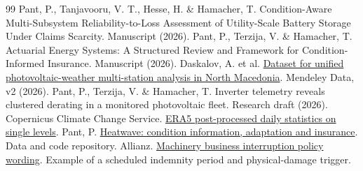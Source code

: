\documentclass[11pt,a4paper]{article}
\begin{document}
\begin{thebibliography}{99}
 Pant, P., Tanjavooru, V. T., Hesse, H. \& Hamacher, T. Condition-Aware Multi-Subsystem Reliability-to-Loss Assessment of Utility-Scale Battery Storage Under Claims Scarcity. Manuscript (2026).
 Pant, P., Terzija, V. \& Hamacher, T. Actuarial Energy Systems: A Structured Review and Framework for Condition-Informed Insurance. Manuscript (2026).
 Daskalov, A. et al. \href{https://doi.org/10.17632/4zgsckxpdy.2}{Dataset for unified photovoltaic-weather multi-station analysis in North Macedonia}. Mendeley Data, v2 (2026).
 Pant, P., Terzija, V. \& Hamacher, T. Inverter telemetry reveals clustered derating in a monitored photovoltaic fleet. Research draft (2026).
 Copernicus Climate Change Service. \href{https://cds.climate.copernicus.eu/datasets/derived-era5-single-levels-daily-statistics?tab=overview}{ERA5 post-processed daily statistics on single levels}.
 Pant, P. \href{https://github.com/Prashantgrid/Heatwave}{Heatwave: condition information, adaptation and insurance}. Data and code repository.
 Allianz. \href{https://www.allianz.co.uk/content/dam/onemarketing/azuk/allianzcouk/broker/docs/products/machinery-business-interruption/policy-wordings/mbi-policy-wording-acew1288-18.pdf}{Machinery business interruption policy wording}. Example of a scheduled indemnity period and physical-damage trigger.
\end{thebibliography}
\endgroup
\end{document}
